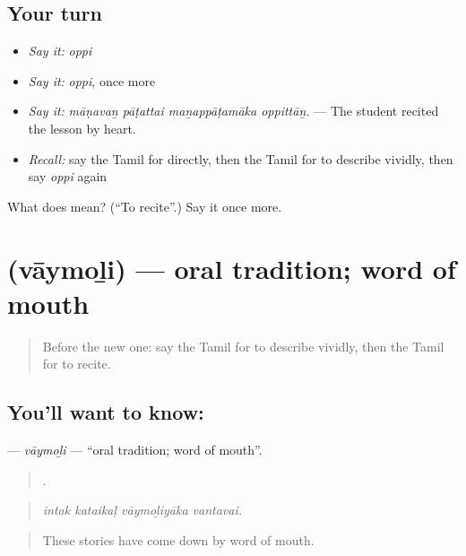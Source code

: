 \subsection*{Your turn}
\begin{itemize}
\raggedright
  \item \emph{Say it:} \emph{oppi}
  \item \emph{Say it:} \emph{oppi}, once more
  \item \emph{Say it:} \emph{māṇavaṉ pāṭattai maṉappāṭamāka oppittāṉ.} — The student recited the lesson by heart.
  \item \emph{Recall:} say the Tamil for directly, then the Tamil for to describe vividly, then say \emph{oppi} again
\end{itemize}

\begin{tcolorbox}[breakable,colback=teal!4,colframe=teal!35!black,title={Before you move on}]
What does  mean? (\textquotedblleft{}To recite\textquotedblright{}.) Say it once more.
\end{tcolorbox}
\section[\texorpdfstring{\ta{வாய்மொழி} (vāymoḻi)}{வாய்மொழி (vāymoḻi)}]{ (vāymoḻi) — oral tradition; word of mouth}

\label{lesson:TA-C312-vaymoli}



\begin{quote}
Before the new one: say the Tamil for to describe vividly, then the Tamil for to recite.
\end{quote}

\subsection*{You'll want to know: }
\textbf{} — \emph{vāymoḻi} — \textquotedblleft{}oral tradition; word of mouth\textquotedblright{}.

\begin{quote}
   .
\end{quote}

\begin{quote}
\emph{intak kataikaḷ vāymoḻiyāka vantavai.}
\end{quote}

\begin{quote}
These stories have come down by word of mouth.
\end{quote}

